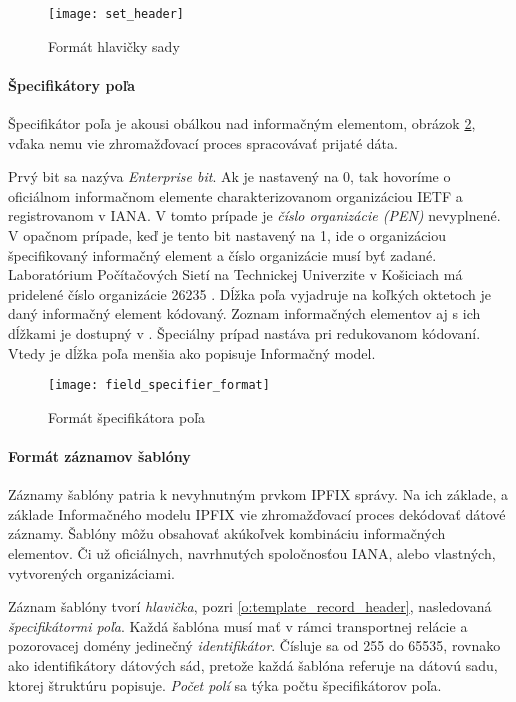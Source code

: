 \begin{figure}[ht!]
\centering
\texttt{[image: set\_header]}
\caption{Formát hlavičky sady}\label{o:set_header}
\end{figure}

\paragraph{Špecifikátory poľa}

Špecifikátor poľa je akousi obálkou nad informačným elementom, obrázok \ref{o:field_specifier_format}, 
vďaka nemu vie zhromažďovací proces spracovávať prijaté dáta. 

Prvý bit sa nazýva \emph{Enterprise bit}.
Ak je nastavený na 0, tak hovoríme o oficiálnom informačnom elemente charakterizovanom organizáciou IETF a 
registrovanom v IANA. 
V tomto prípade je \emph{číslo organizácie (PEN)} nevyplnené. V opačnom prípade, 
keď je tento bit nastavený na 1, ide o organizáciou špecifikovaný informačný element a číslo organizácie
musí byť zadané. Laboratórium Počítačových Sietí na Technickej Univerzite v Košiciach má pridelené číslo 
organizácie 26235 \citep{pen}.
Dĺžka poľa vyjadruje na koľkých oktetoch je daný informačný element kódovaný. 
Zoznam informačných elementov aj s ich dĺžkami je dostupný v \citep{rfc5102}.
Špeciálny prípad nastáva pri redukovanom kódovaní. Vtedy je dĺžka poľa menšia ako popisuje 
Informačný model. 
 
\begin{figure}[ht!]
\centering
\texttt{[image: field\_specifier\_format]}
\caption{Formát špecifikátora poľa}\label{o:field_specifier_format}
\end{figure}



\paragraph{Formát záznamov šablóny}

Záznamy šablóny patria k nevyhnutným prvkom IPFIX správy. Na ich základe, a základe Informačného modelu
IPFIX \citep{rfc5102} vie zhromažďovací proces dekódovať dátové záznamy.
Šablóny môžu obsahovať akúkoľvek kombináciu informačných elementov. Či už oficiálnych, navrhnutých 
spoločnosťou IANA, alebo vlastných, vytvorených organizáciami.

Záznam šablóny tvorí \emph{hlavička}, pozri \ref{o:template_record_header}, nasledovaná 
\emph{špecifikátormi poľa}. 
Každá šablóna musí mať v rámci transportnej relácie a pozorovacej domény jedinečný \emph{identifikátor}. 
Čísluje sa od 255 do 65535, rovnako ako identifikátory dátových sád, pretože každá šablóna referuje 
na dátovú sadu, ktorej štruktúru popisuje. \emph{Počet polí} sa týka počtu 
špecifikátorov poľa.

